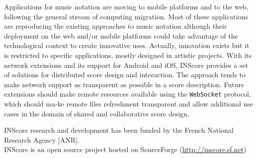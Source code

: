 \documentclass{article}
\newcommand{\code}[1]		{{\small \texttt{#1}}}
\begin{document}
Applications for music notation are moving to mobile platforms and to the web, following the general stream of  computing migration. Most of these applications are reproducing the existing approaches to music notation although their deployment on the web and/or mobile platforms could take advantage of the technological context to create innovative uses. Actually, innovation exists but it is restricted to specific applications, mostly designed in artistic projects. With its network extensions and its support for Android and iOS, INScore provides a set of solutions for distributed score design and interaction. The approach tends to make network support as transparent as possible in a score description. Future extensions should make remote resources available using the \code{WebSocket} protocol, which should ma-ke remote files refreshment transparent and allow additional use cases in the domain of shared and collaborative score design.



\begin{acknowledgments}
INScore research and development has been funded by the French National Research Agency [ANR].\\
INScore is an open source project hosted on SourceForge {\small (\url{http://inscore.sf.net})}
\end{acknowledgments} 

\balance

\end{document}
